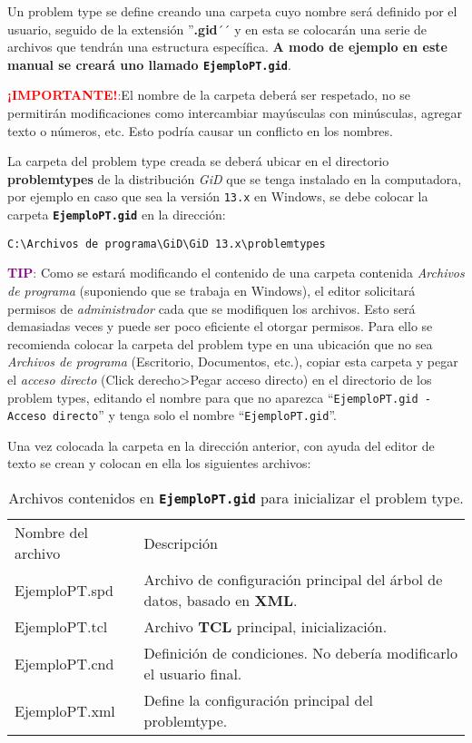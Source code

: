 \documentclass[10pt, a4paper, twocolumn]{article}
\begin{document}
Un problem type se define creando una carpeta cuyo nombre será definido por el usuario, seguido de la extensión ''\textbf{.gid}´´ y en esta se colocarán una serie de archivos que tendrán una estructura específica. \textbf{A modo de ejemplo en este manual se creará uno llamado \texttt{EjemploPT.gid}}.

\textcolor{red}{\textbf{¡IMPORTANTE!}:}El nombre de la carpeta deberá ser respetado, no se permitirán modificaciones como intercambiar mayúsculas con minúsculas, agregar texto o números, etc. Esto podría causar un conflicto en los nombres.

La carpeta del problem type creada se deberá ubicar en el directorio \textbf{problemtypes} de la distribución \textit{GiD} que se tenga instalado en la computadora, por ejemplo en caso que sea la versión \texttt{13.x} en Windows, se debe colocar la carpeta \textbf{\texttt{EjemploPT.gid}} en la dirección:

\begin{small}
\begin{verbatim}
C:\Archivos de programa\GiD\GiD 13.x\problemtypes
\end{verbatim}
\end{small}

\textcolor{purple}{\textbf{TIP}:} Como se estará modificando el contenido de una carpeta contenida \textit{Archivos de programa} (suponiendo que se trabaja en Windows), el editor solicitará permisos de \textit{administrador} cada que se modifiquen los archivos. Esto será demasiadas veces y puede ser poco eficiente el otorgar permisos. Para ello se recomienda colocar la carpeta del problem type en una ubicación que no sea \textit{Archivos de programa} (Escritorio, Documentos, etc.), copiar esta carpeta y pegar el \textit{acceso directo} (Click derecho>Pegar acceso directo) en el directorio de los problem types, editando el nombre para que no aparezca ``\texttt{EjemploPT.gid - Acceso directo}'' y tenga solo el nombre ``\texttt{EjemploPT.gid}''.

Una vez colocada la carpeta en la dirección anterior, con ayuda del editor de texto se crean y colocan en ella los siguientes archivos:

\begin{table}[hbtp!]
	\begin{tabular}{l m{4.5cm}}
		\rowcolor{BlueGiD!60} Nombre del archivo & Descripción\\
		\rowcolor{BlueGiD!20} EjemploPT.spd & Archivo de configuración principal del árbol de datos, basado en \textbf{XML}.\\
		EjemploPT.tcl & Archivo \textbf{TCL} principal, inicialización.\\
		\rowcolor{BlueGiD!20} EjemploPT.cnd & Definición de condiciones. No debería modificarlo el usuario final.\\
		EjemploPT.xml & Define la configuración principal del problemtype.\\
	\end{tabular}
	\caption{Archivos contenidos en \textbf{\texttt{EjemploPT.gid}} para inicializar el problem type.\label{tab:estructuraArchivos}}
\end{table}
\end{document}
